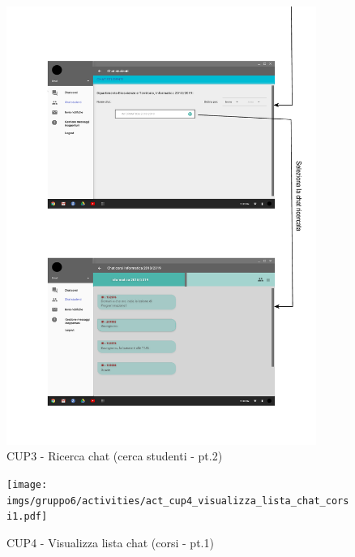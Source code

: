 \begin{figure}
	\centering
	\includegraphics[width=0.9\textwidth]{imgs/gruppo6/activities/act_cup3_ricerca_chat_studenti2.pdf}
	\caption{CUP3 - Ricerca chat (cerca studenti - pt.2)}
	\label{fig:cup3-8}
\end{figure}

\begin{figure}
	\centering
	\texttt{[image: imgs/gruppo6/activities/act\_cup4\_visualizza\_lista\_chat\_corsi1.pdf]}
	\caption{CUP4 - Visualizza lista chat (corsi - pt.1)}
	\label{fig:cup4}
\end{figure}

